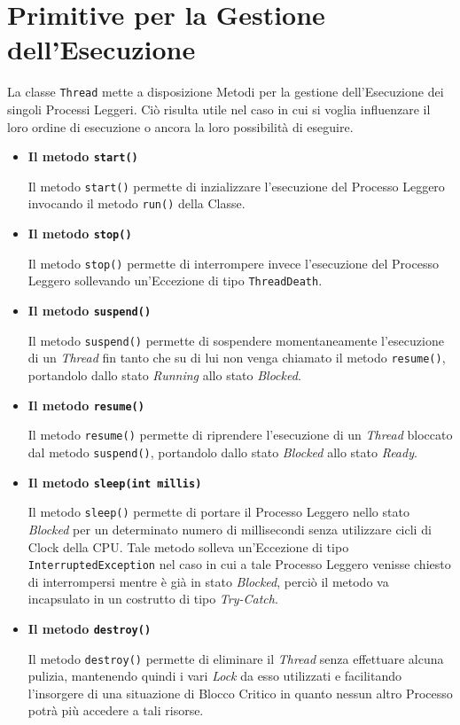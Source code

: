 \section{Primitive per la Gestione dell'Esecuzione}
La classe \texttt{Thread} mette a disposizione Metodi per la gestione dell'Esecuzione dei singoli Processi Leggeri\cite{SeminarioJavaDispense}. Ciò risulta utile nel caso in cui si voglia influenzare il loro ordine di esecuzione o ancora la loro possibilità di eseguire. \par
\begin{itemize}
    \item \textbf{Il metodo \texttt{start()}} \par
    Il metodo \texttt{start()} permette di inzializzare l'esecuzione del Processo Leggero invocando il metodo \texttt{run()} della Classe.
    \item \textbf{Il metodo \texttt{stop()}} \par
    Il metodo \texttt{stop()} permette di interrompere invece l'esecuzione del Processo Leggero sollevando un'Eccezione di tipo \texttt{ThreadDeath}.
    \item \textbf{Il metodo \texttt{suspend()}} \par
    Il metodo \texttt{suspend()} permette di sospendere momentaneamente l'esecuzione di un \textit{Thread} fin tanto che su di lui non venga chiamato il metodo \texttt{resume()}, portandolo dallo stato \textit{Running} allo stato \textit{Blocked}.
    \item \textbf{Il metodo \texttt{resume()}} \par
    Il metodo \texttt{resume()} permette di riprendere l'esecuzione di un \textit{Thread} bloccato dal metodo \texttt{suspend()}, portandolo dallo stato \textit{Blocked} allo stato \textit{Ready}.
    \item \textbf{Il metodo \texttt{sleep(int millis)}} \par
    Il metodo \texttt{sleep()} permette di portare il Processo Leggero nello stato \textit{Blocked} per un determinato numero di millisecondi senza utilizzare cicli di Clock della CPU. Tale metodo solleva un'Eccezione di tipo \texttt{InterruptedException} nel caso in cui a tale Processo Leggero venisse chiesto di interrompersi mentre è già in stato \textit{Blocked}, perciò il metodo va incapsulato in un costrutto di tipo \textit{Try-Catch}.
    \item \textbf{Il metodo \texttt{destroy()}} \par
    Il metodo \texttt{destroy()} permette di eliminare il \textit{Thread} senza effettuare alcuna pulizia, mantenendo quindi i vari \textit{Lock} da esso utilizzati e facilitando l'insorgere di una situazione di Blocco Critico in quanto nessun altro Processo potrà più accedere a tali risorse.

\end{itemize}
